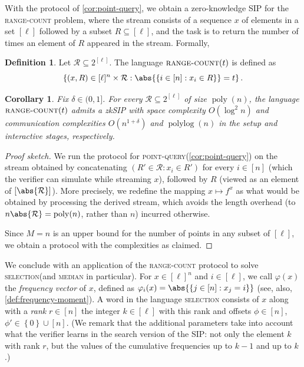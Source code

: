 \documentclass[a4paper,UKenglish,cleveref, autoref, thm-restate]{lipics-v2021}
\newtheorem{corollary}[theorem]{Corollary}
\theoremstyle{definition}
\newtheorem{definition}[theorem]{Definition}
\newcommand{\zksip}{\textrm{zkSIP}}
\renewcommand{\set}[1]{\left\{#1\right\}}
\newcommand{\poly}{\operatorname{poly}}
\newcommand{\polylog}{\operatorname{polylog}}
\newcommand{\pointquery}{\normalfont\textsc{point-query}\xspace}
\newcommand{\rangecount}{\normalfont\textsc{range-count}\xspace}
\newcommand{\selection}{\normalfont\textsc{selection}\xspace}
\newcommand{\median}{\normalfont\textsc{median}\xspace}
\begin{document}
With the protocol of \cref{cor:point-query}, we obtain a zero-knowledge SIP for the \rangecount problem, where the stream consists of a sequence $x$ of elements in a set $[\ell]$ followed by a subset $R \subseteq [\ell]$, and the task is to return the number of times an element of $R$ appeared in the stream. Formally,
\begin{definition}
  \label{def:range-count}
  Let $\mathcal{R} \subseteq 2^{[\ell]}$. The language $\rangecount(t)$ is defined as
  \begin{equation*}
      \set{(x, R) \in [\ell]^n \times \mathcal{R} : \abs{\set{i \in [n]: x_i \in R}} = t}.
  \end{equation*}
\end{definition}
\begin{corollary}
    \label{cor:range-count}
    Fix $\delta \in (0,1]$. For every $\mathcal{R} \subseteq 2^{[\ell]}$ of size $\poly(n)$, the language $\rangecount(t)$ admits a \zksip{} with space complexity $O(\log^2 n)$ and communication complexities $O(n^{1 + \delta})$ and $\polylog(n)$ in the setup and interactive stages, respectively. 
\end{corollary}
\begin{proof}[Proof sketch]
    We run the protocol for \pointquery (\cref{cor:point-query}) on the stream obtained by concatenating $(R' \in \mathcal{R} : x_i \in R')$ for every $i \in [n]$ (which the verifier can simulate while streaming $x$), followed by $R$ (viewed as an element of $[\abs{\mathcal{R}}]$). More precisely, we redefine the mapping $x \mapsto f^x$ as what would be obtained by processing the derived stream, which avoids the length overhead (to $n \abs{\mathcal{R}} = \poly(n)$, rather than $n$) incurred otherwise.
    
    Since $M = n$ is an upper bound for the number of points in any subset of $[\ell]$, we obtain a protocol with the complexities as claimed.
\end{proof}

We conclude with an application of the \rangecount protocol to solve \selection (and \median in particular). For $x \in [\ell]^n$ and $i \in [\ell]$, we call $\varphi(x)$ the \emph{frequency vector} of $x$, defined as $\varphi_i(x) = \abs{\set{j \in [n] : x_j = i}}$ (see, also, \cref{def:frequency-moment}). A word in the language \selection consists of $x$ along with a \emph{rank} $r \in [n]$ the integer $k \in [\ell]$ with this rank and offsets $\phi \in [n]$, $\phi' \in \set{0} \cup [n]$. (We remark that the additional parameters take into account what the verifier learns in the search version of the SIP: not only the element $k$ with rank $r$, but the values of the cumulative frequencies up to $k - 1$ and up to $k$.)
\end{document}
